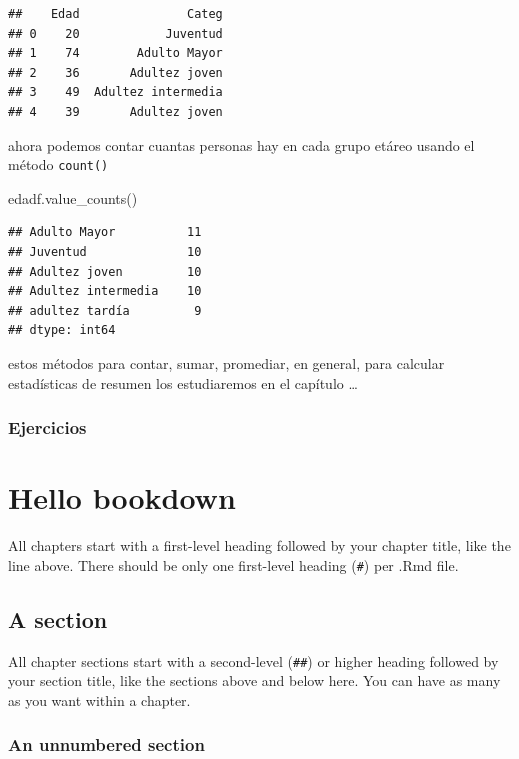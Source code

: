 \documentclass[
]{book}
\newenvironment{Shaded}{\begin{snugshade}}{\end{snugshade}}
\newcommand{\NormalTok}[1]{#1}
\theoremstyle{definition}
\theoremstyle{definition}
\theoremstyle{definition}
\theoremstyle{definition}
\theoremstyle{remark}
\begin{document}
\begin{verbatim}
##    Edad               Categ
## 0    20            Juventud
## 1    74        Adulto Mayor
## 2    36       Adultez joven
## 3    49  Adultez intermedia
## 4    39       Adultez joven
\end{verbatim}

ahora podemos contar cuantas personas hay en cada grupo etáreo usando el método \texttt{count()}

\begin{Shaded}
\begin{Highlighting}[]
\NormalTok{edadf.value\_counts() }
\end{Highlighting}
\end{Shaded}

\begin{verbatim}
## Adulto Mayor          11
## Juventud              10
## Adultez joven         10
## Adultez intermedia    10
## adultez tardía         9
## dtype: int64
\end{verbatim}

estos métodos para contar, sumar, promediar, en general, para calcular estadísticas de resumen los estudiaremos en el capítulo \ldots{}

\hypertarget{ejercicios-3}{%
\subsection{Ejercicios}\label{ejercicios-3}}

\hypertarget{hello-bookdown}{%
\chapter{Hello bookdown}\label{hello-bookdown}}

All chapters start with a first-level heading followed by your chapter title, like the line above. There should be only one first-level heading (\texttt{\#}) per .Rmd file.

\hypertarget{a-section}{%
\section{A section}\label{a-section}}

All chapter sections start with a second-level (\texttt{\#\#}) or higher heading followed by your section title, like the sections above and below here. You can have as many as you want within a chapter.

\hypertarget{an-unnumbered-section}{%
\subsection*{An unnumbered section}\label{an-unnumbered-section}}
\end{document}
